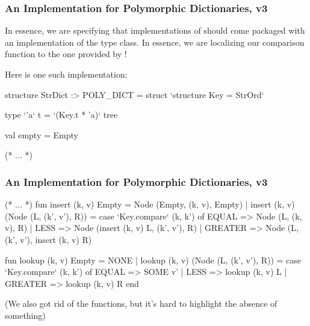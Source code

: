 \documentclass[aspectratio=169, handout]{beamer}
\begin{document}
\begin{frame}[fragile]
  \frametitle{An Implementation for Polymorphic Dictionaries, v3}

  In essence, we are specifying that implementations of 
  should come packaged with an implementation of the  type class.
  In essence, we are localizing our comparison function to the one provided
  by !

  \pause
  \vspace{\fill}

  Here is one such implementation:

  \begin{codeblock}
    structure StrDict :> POLY_DICT =
      struct
        `structure Key = StrOrd`

        type `'a` t = `(Key.t * 'a)` tree

        val empty = Empty

      (* ... *)
  \end{codeblock}
\end{frame}

\begin{frame}[fragile]
  \frametitle{An Implementation for Polymorphic Dictionaries, v3}

  \small
  \begin{codeblock}
    (* ... *)
      fun insert (k, v) Empty = Node (Empty, (k, v), Empty)
        | insert (k, v) (Node (L, (k', v'), R)) =
            case `Key.compare` (k, k') of
              EQUAL   => Node (L, (k, v), R)
            | LESS    => Node (insert (k, v) L, (k', v'), R)
            | GREATER => Node (L, (k', v'), insert (k, v) R)

      fun lookup (k, v) Empty = NONE
        | lookup (k, v) (Node (L, (k', v'), R)) =
            case `Key.compare` (k, k') of
              EQUAL   => SOME v'
            | LESS    => lookup (k, v) L
            | GREATER => lookup (k, v) R
    end
  \end{codeblock}

  \pause
  \vspace{\fill}

  (We also got rid of the  functions, but it's hard to highlight the
  absence of something)
\end{frame}
\end{document}
